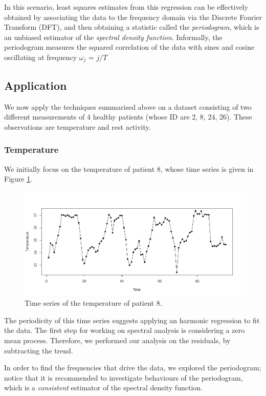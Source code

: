 \documentclass[]{article}
\begin{document}
In this scenario, least squares estimates from this regression can be effectively obtained by associating the data to the frequency domain via the Discrete Fourier Transform (DFT), and then obtaining a statistic called the \textit{periodogram}, which is an unbiased estimator of the \textit{spectral density function}. Informally, the periodogram 
measures the squared correlation of the data with sines and cosine oscillating at frequency $\omega_j$ = $j/T$

\subsection{Application}
We now apply the techniques summarised above on a dataset consisting of two different measurements of 4 healthy patients (whose ID are 2, 8, 24, 26). These observations are temperature and rest activity. 

\subsubsection*{Temperature}
We initially focus on the temperature of patient 8, whose time series is given in Figure \ref{fig:Temp8}.


\begin{figure}[ht]\centering
	\includegraphics[scale = 0.3]{Temp8.png}
	\caption{Time series of the temperature of patient 8.}
	\label{fig:Temp8}
\end{figure}

The periodicity of this time series suggests applying an harmonic regression to fit the data. The first step for working on spectral analysis is considering a zero mean process. Therefore, we performed our analysis on the residuals, by subtracting the trend. 

In order to find the frequencies that drive the data, we explored the periodogram; notice that it is recommended to investigate behaviours of the  periodogram, which is a \textit{consistent} estimator of the spectral density function. 
\end{document}

